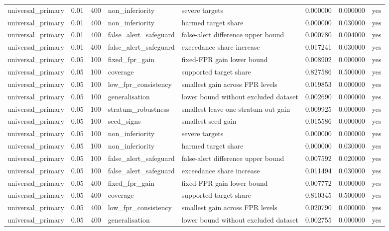 \begin{tabular}{llllllll}
universal\_primary & 0.01 & 400 & non\_inferiority & severe targets & 0.000000 & 0.000000 & yes \\
universal\_primary & 0.01 & 400 & non\_inferiority & harmed target share & 0.000000 & 0.030000 & yes \\
universal\_primary & 0.01 & 400 & false\_alert\_safeguard & false-alert difference upper bound & 0.000780 & 0.004000 & yes \\
universal\_primary & 0.01 & 400 & false\_alert\_safeguard & exceedance share increase & 0.017241 & 0.030000 & yes \\
universal\_primary & 0.05 & 100 & fixed\_fpr\_gain & fixed-FPR gain lower bound & 0.008902 & 0.000000 & yes \\
universal\_primary & 0.05 & 100 & coverage & supported target share & 0.827586 & 0.500000 & yes \\
universal\_primary & 0.05 & 100 & low\_fpr\_consistency & smallest gain across FPR levels & 0.019853 & 0.000000 & yes \\
universal\_primary & 0.05 & 100 & generalisation & lower bound without excluded dataset & 0.002690 & 0.000000 & yes \\
universal\_primary & 0.05 & 100 & stratum\_robustness & smallest leave-one-stratum-out gain & 0.009925 & 0.000000 & yes \\
universal\_primary & 0.05 & 100 & seed\_signs & smallest seed gain & 0.015586 & 0.000000 & yes \\
universal\_primary & 0.05 & 100 & non\_inferiority & severe targets & 0.000000 & 0.000000 & yes \\
universal\_primary & 0.05 & 100 & non\_inferiority & harmed target share & 0.000000 & 0.030000 & yes \\
universal\_primary & 0.05 & 100 & false\_alert\_safeguard & false-alert difference upper bound & 0.007592 & 0.020000 & yes \\
universal\_primary & 0.05 & 100 & false\_alert\_safeguard & exceedance share increase & 0.011494 & 0.030000 & yes \\
universal\_primary & 0.05 & 400 & fixed\_fpr\_gain & fixed-FPR gain lower bound & 0.007772 & 0.000000 & yes \\
universal\_primary & 0.05 & 400 & coverage & supported target share & 0.810345 & 0.500000 & yes \\
universal\_primary & 0.05 & 400 & low\_fpr\_consistency & smallest gain across FPR levels & 0.020790 & 0.000000 & yes \\
universal\_primary & 0.05 & 400 & generalisation & lower bound without excluded dataset & 0.002755 & 0.000000 & yes \\

\end{tabular}
